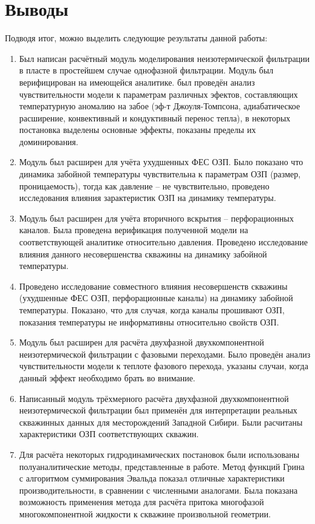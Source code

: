 \section*{Выводы}
\setcounter{subsection}{0}
	Подводя итог, можно выделить следующие результаты данной работы:
\begin{enumerate}
	\item{Был написан расчётный модуль моделирования неизотермической фильтрации в пласте в простейшем случае однофазной фильтрации. Модуль был верифицирован на имеющейся аналитике. был проведён анализ чувствительности модели к параметрам различных эфектов, составляющих температурную аномалию на забое (эф-т Джоуля-Томпсона, адиабатическое расширение, конвективный и кондуктивный перенос тепла), в некоторых постановка выделены основные эффекты, показаны пределы их доминирования.}
	\item{Модуль был расширен для учёта ухудшенных ФЕС ОЗП. Было показано что динамика забойной температуры чувствительна к параметрам ОЗП (размер, проницаемость), тогда как давление -- не чувствительно, проведено исследования влияния зарактеристик ОЗП на динамику температуры.}
	\item{Модуль был расширен для учёта вторичного вскрытия -- перфорационных каналов. Была проведена верификация полученной модели на соответствующей аналитике относительно давления. Проведено исследование влияния данного несовершенства скважины на динамику забойной температуры.}
	\item{Проведено исследование совместного влияния несовершенств скважины (ухудшенные ФЕС ОЗП, перфорационные каналы) на динамику забойной температуры. Показано, что для случая, когда каналы прошивают ОЗП, показания температуры не информативны относительно свойств ОЗП.}
	\item{Модуль был расширен для расчёта двухфазной двухкомпонентной неизотермической фильтрации с фазовыми переходами. Было проведён анализ чувствительности модели к теплоте фазового перехода, указаны случаи, когда данный эффект необходимо брать во внимание.}
	\item{Написанный модуль трёхмерного расчёта двухфазной двухкомпонентной неизотермической фильтрации был применён для интерпретации реальных скважинных данных для месторождений Западной Сибири. Были расчитаны характеристики ОЗП соответствующих скважин.}
	\item{Для расчёта некоторых гидродинамических постановок были использованы полуаналитические методы, представленные в работе. Метод функций Грина с алгоритмом суммирования Эвальда показал отличные характеристики производительности, в сравнении с численными аналогами. Была показана возможность применения метода для расчёта притока многофазой многокомпонентной жидкости к скважине произвольной геометрии.}
\end{enumerate}

